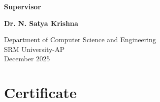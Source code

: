 \documentclass[12pt,a4paper]{report}
\begin{document}
\begin{titlepage}
\begin{center}
                

        

                \vspace{1.5cm}

        

                

        

                \textbf{Supervisor}

        

                

        

                \vspace{0.5cm}

        

                \textbf{Dr. N. Satya Krishna}

        

                

        

                \vfill

        

                

        

                \Large

        

                Department of Computer Science and Engineering\\

        

                SRM University-AP\\

        

                December 2025

        

                

        

            \end{center}

        

        \end{titlepage}

        

        

        


        

        \chapter*{Certificate}
\end{document}
